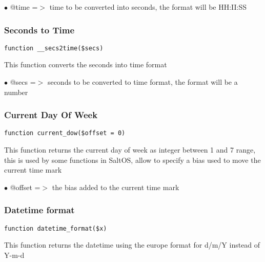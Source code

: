 \documentclass[a4paper]{article}
\begin{document}
\begin{compactitem}
\item[\color{myblue}$\bullet$] @time =$>$ time to be converted into seconds, the format will be HH:II:SS
\end{compactitem}

\hypertarget{toc108}{}
\subsubsection{Seconds to Time}

\begin{lstlisting}
function __secs2time($secs)
\end{lstlisting}

This function converts the seconds into time format

\begin{compactitem}
\item[\color{myblue}$\bullet$] @secs =$>$ seconds to be converted to time format, the format will be a number
\end{compactitem}

\hypertarget{toc109}{}
\subsubsection{Current Day Of Week}

\begin{lstlisting}
function current_dow($offset = 0)
\end{lstlisting}

This function returns the current day of week as integer between 1 and 7
range, this is used by some functions in SaltOS, allow to specify a bias
used to move the current time mark

\begin{compactitem}
\item[\color{myblue}$\bullet$] @offset =$>$ the bias added to the current time mark
\end{compactitem}

\hypertarget{toc110}{}
\subsubsection{Datetime format}

\begin{lstlisting}
function datetime_format($x)
\end{lstlisting}

This function returns the datetime using the europe format for d/m/Y instead of Y-m-d
\end{document}
